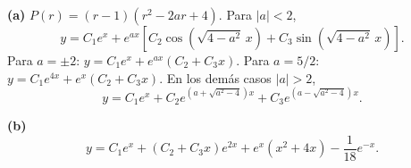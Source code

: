 \noindent\textbf{(a)} \(P(r)=(r-1)(r^2-2ar+4)\). Para \(|a|<2\),
\[y=C_1e^x+e^{ax}[C_2\cos(\sqrt{4-a^2}\,x)+C_3\sin(\sqrt{4-a^2}\,x)].\]
Para \(a=\pm2\): \(y=C_1e^x+e^{ax}(C_2+C_3x)\).
Para \(a=5/2\): \(y=C_1e^{4x}+e^x(C_2+C_3x)\).
En los demás casos \(|a|>2\),
\[y=C_1e^x+C_2e^{(a+\sqrt{a^2-4})x}+C_3e^{(a-\sqrt{a^2-4})x}.\]

\noindent\textbf{(b)} \[y=C_1e^x+(C_2+C_3x)e^{2x}+e^x(x^2+4x)-\frac1{18}e^{-x}.\]

